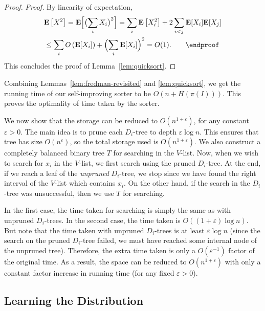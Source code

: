 \documentclass{siamltex}
\newcommand{\eps}{\varepsilon}
\newcommand{\EX}{\hbox{\bf E}}
\begin{document}
\begin{proof}
\emph{Proof.}
By linearity of expectation,
\begin{multline*}
\EX\left[X^2\right]  = \EX\Bigl[\bigl(\sum_i X_i\bigr)^2\Bigr] = 
\sum_i \EX\left[X_i^2\right] + 2\sum_{i < j} \EX[X_i] \EX[X_j] \\
 \leq  \sum_i O\left(\EX[{X_i}]\right) + \Bigl(\sum_i \EX[X_i]\Bigr)^2 = O(1).
 \qquad \endproof
\end{multline*}
This concludes the proof of Lemma~\ref{lem:quicksort}.
\end{proof}
\medskip

Combining Lemmas~\ref{lem:fredman-revisited} and \ref{lem:quicksort}, 
we get the running time
of our self-improving sorter to be $O(n + H(\pi(I)))$.
This proves the optimality of time taken by the sorter.

We now show that the
storage can be reduced to $O(n^{1+\eps})$,
for any constant $\eps > 0$. The main idea is to prune each 
$D_i$-tree to depth $\eps\log n$. This ensures that 
tree has size $O(n^\eps)$, so the total storage used is
$O(n^{1+\eps})$. We also construct a completely balanced binary
tree $T$ for searching in the $V$-list. Now, when we wish to search
for $x_i$ in the $V$-list, we first search using the pruned $D_i$-tree.
At the end, if we reach a leaf of the \emph{unpruned} $D_i$-tree,
we stop since we have found the right interval of the $V$-list
which contains $x_i$. On the other hand, if the search in the $D_i$-tree
was unsuccessful, then we use $T$ for searching.

In the first case, the time taken for searching is
simply the same as with
unpruned $D_i$-trees. In the second case, the time
taken is $O((1+\eps)\log n)$. But note that the time
taken with unpruned $D_i$-trees is at least $\eps\log n$
(since the search on the pruned $D_i$-tree failed, we
must have reached some internal node of the unpruned tree).
Therefore, the extra time taken is only a $O(\eps^{-1})$ factor
of the original time. As a result, the space can be
reduced to $O(n^{1+\eps})$ with only a constant factor
increase in running time (for any fixed $\eps > 0$).

\subsection{Learning the Distribution}\label{sec:SI-sort}
\end{document}
